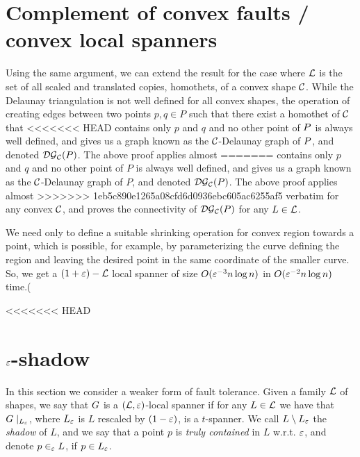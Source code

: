 \documentclass[12pt]{article}%
\begin{document}
\section{Complement of convex faults / convex local spanners}
Using the same argument, we can extend the result for the case where
$\mathcal{L}$ is the set of all scaled and translated copies, homothets, of a
convex shape $\mathcal{C}$. While the Delaunay triangulation is not well
defined for all convex shapes, the operation of creating edges between
two points $p,q\in P$ such that there exist a homothet of $\mathcal{C}$ that
<<<<<<< HEAD
contains only $p$ and $q$ and no other point of $P$ is always well
defined, and gives us a graph known as the $\mathcal{C}$-Delaunay graph of
$P$, and denoted $\mathcal{DG}_{\mathcal{C}}(P)$. The above proof applies almost
=======
contains only $p$ and $q$ and no other point of $P$ is always well
defined, and gives us a graph known as the $\mathcal{C}$-Delaunay graph of
$P$, and denoted $\mathcal{DG}_{\mathcal{C}}(P)$. The above proof applies almost
>>>>>>> 1eb5c890e1265a08cfd6d0936ebc605ac6255af5
verbatim for any convex $\mathcal{C}$, and proves the connectivity of
$\mathcal{DG}_{\mathcal{C}}(P)$ for any $L\in \mathcal{L}$.

We need only to define a suitable shrinking operation for convex
region towards a point, which is possible, for example, by
parameterizing the curve defining the region and leaving the desired
point in the same coordinate of the smaller curve. So, we get a
$(1+\varepsilon)-\mathcal{L}$ local spanner of size $O(\varepsilon^{-3}n\log n)$ in
$O(\varepsilon^{-2}n\log n)$ time.(


<<<<<<< HEAD

\section{$\varepsilon$-shadow}

In this section we consider a weaker form of fault tolerance. Given a
family $\mathcal{L}$ of shapes, we say that $G$ is a $(\mathcal{L},\varepsilon)$-local
spanner if for any $L\in\mathcal{L}$ we have that $G\mid_{L_{\varepsilon}}$, where
$L_{\varepsilon}$ is $L$ rescaled by $(1-\varepsilon)$, is a $t$-spanner. We call
$L\setminus L_{\varepsilon}$ the \emph{shadow} of $L$, and we say that a
point $p$ is \emph{truly contained} in $L$ w.r.t. $\varepsilon$, and denote
$p\in_{\varepsilon} L$, if $p\in L_{\varepsilon}$.
\end{document}
